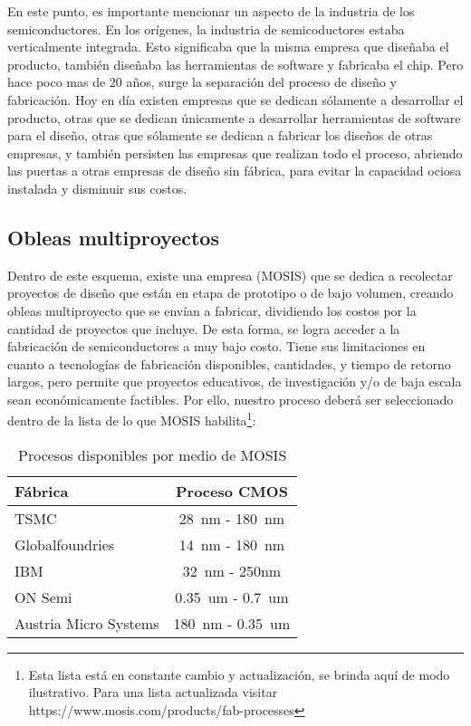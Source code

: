 En este punto, es importante mencionar un aspecto de la industria de los semiconductores. En los orígenes, la industria de semicoductores estaba verticalmente integrada. Esto significaba que la misma empresa que diseñaba el producto, también diseñaba las herramientas de software y fabricaba el chip. Pero hace poco mas de 20 años, surge la separación del proceso de diseño y fabricación. Hoy en día existen empresas que se dedican sólamente a desarrollar el producto, otras que se dedican únicamente a desarrollar herramientas de software para el diseño, otras que sólamente se dedican a fabricar los diseños de otras empresas, y también persisten las empresas que realizan todo el proceso, abriendo las puertas a otras empresas de diseño sin fábrica, para evitar la capacidad ociosa instalada y disminuir sus costos.
\subsection{Obleas multiproyectos}
Dentro de este esquema, existe una empresa (MOSIS) que se dedica a recolectar proyectos de diseño que están en etapa de prototipo o de bajo volumen, creando obleas multiproyecto que se envían a fabricar, dividiendo los costos por la cantidad de proyectos que incluye. De esta forma, se logra acceder a la fabricación de semiconductores a muy bajo costo. Tiene sus limitaciones en cuanto a tecnologías de fabricación disponibles, cantidades, y tiempo de retorno largos, pero permite que proyectos educativos, de investigación y/o de baja escala sean económicamente factibles.
Por ello, nuestro proceso deberá ser seleccionado dentro de la lista de lo que MOSIS habilita\footnote{Esta lista está en constante cambio y actualización, se brinda aquí de modo ilustrativo. Para una lista actualizada visitar https://www.mosis.com/products/fab-processes }:

\begin{table}[h]
\centering
\begin{tabular}{@{}lc@{}}
\toprule
Fábrica             & Proceso CMOS \\ \midrule
TSMC                & 28~nm - 180~nm             \\
Globalfoundries     & 14~nm - 180~nm             \\
IBM                 & 32~nm -  250nm            \\
ON Semi             & 0.35~um - 0.7~um           \\
Austria Micro Systems & 180~nm - 0.35~um           \\ \bottomrule
\end{tabular}
\caption{Procesos disponibles por medio de MOSIS}
\label{cuadro:procesosDisponibles}
\end{table}

